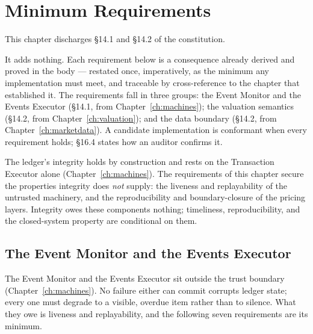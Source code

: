 \section{Minimum Requirements}\label{ch:requirements}

This chapter discharges \S 14.1 and \S 14.2 of the constitution.

It adds nothing. Each requirement below is a consequence already derived and proved in
the body --- restated once, imperatively, as the minimum any implementation must meet, and
traceable by cross-reference to the chapter that established it. The requirements fall in
three groups: the Event Monitor and the Events Executor (\S 14.1, from
Chapter~\ref{ch:machines}); the valuation semantics (\S 14.2, from
Chapter~\ref{ch:valuation}); and the data boundary (\S 14.2, from
Chapter~\ref{ch:marketdata}). A candidate implementation is conformant when every
requirement holds; \S 16.4 states how an auditor confirms it.

\begin{principle}
The ledger's integrity holds by construction and rests on the Transaction Executor alone
(Chapter~\ref{ch:machines}). The requirements of this chapter secure the properties
integrity does \emph{not} supply: the liveness and replayability of the untrusted
machinery, and the reproducibility and boundary-closure of the pricing layers. Integrity
owes these components nothing; timeliness, reproducibility, and the closed-system property
are conditional on them.
\end{principle}

\subsection{The Event Monitor and the Events Executor}

The Event Monitor and the Events Executor sit outside the trust boundary
(Chapter~\ref{ch:machines}). No failure either can commit corrupts ledger state; every one
must degrade to a visible, overdue item rather than to silence. What they owe is liveness
and replayability, and the following seven requirements are its minimum.

